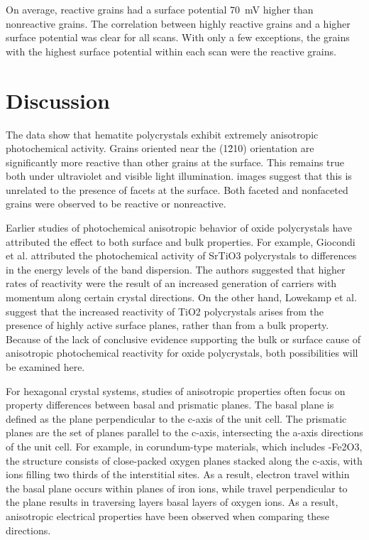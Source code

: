 \documentclass[12pt,%
              twoside,
               letterpaper]{uiothesis}
\begin{document}
On average, reactive grains had a surface potential \SI{70}{\milli\volt} higher than
nonreactive grains. The correlation between highly reactive grains and a higher surface
potential was clear for all scans. With only a few exceptions, the grains with the highest
surface potential within each scan were the reactive grains.

\section{Discussion}\label{sec:ch9discussion}

The data show that hematite polycrystals exhibit extremely anisotropic photochemical
activity. Grains oriented near the (1\={2}10) orientation are significantly more reactive
than other grains at the surface. This remains true both under ultraviolet and visible
light illumination.  images suggest that this is unrelated to the presence of
facets at the surface. Both faceted and nonfaceted grains were observed to be reactive or
nonreactive.

Earlier studies of photochemical anisotropic behavior of oxide polycrystals have
attributed the effect to both surface and bulk properties. For example, Giocondi et
al.\cite{Giocondi:2007fa} attributed the photochemical activity of SrTiO3
polycrystals to differences in the energy levels of the band dispersion. The authors
suggested that higher rates of reactivity were the result of an increased generation of
carriers with momentum along certain crystal directions. On the other hand, Lowekamp et
al.\cite{Lowekamp:1998ks} suggest that the increased reactivity of TiO2 polycrystals
arises from the presence of highly active surface planes, rather than from a bulk
property. Because of the lack of conclusive evidence supporting the bulk or surface cause
of anisotropic photochemical reactivity for oxide polycrystals, both possibilities will be
examined here.

For hexagonal crystal systems, studies of anisotropic properties often focus on property
differences between basal and prismatic planes. The basal plane is defined as the plane
perpendicular to the c-axis of the unit cell. The prismatic planes are the set of planes
parallel to the c-axis, intersecting the a-axis directions of the unit cell. For example,
in corundum-type materials, which includes \textalpha-Fe2O3, the structure consists
of close-packed oxygen planes stacked along the c-axis, with  ions filling two
thirds of the interstitial sites. As a result, electron travel within the basal plane
occurs within planes of iron ions, while travel perpendicular to the plane results in
traversing layers basal layers of oxygen ions.\cite{Iordanova:2005ha} As a result,
anisotropic electrical properties have been observed when comparing these
directions.\cite{Benjelloun:1984cq}
\end{document}
